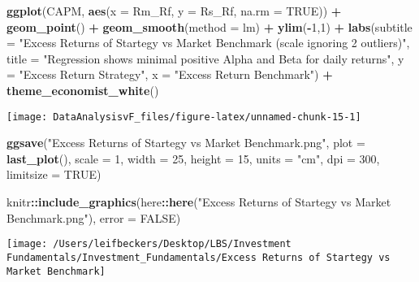 \documentclass[
]{article}
\newenvironment{Shaded}{\begin{snugshade}}{\end{snugshade}}
\newcommand{\DataTypeTok}[1]{\textcolor[rgb]{0.13,0.29,0.53}{#1}}
\newcommand{\DecValTok}[1]{\textcolor[rgb]{0.00,0.00,0.81}{#1}}
\newcommand{\KeywordTok}[1]{\textcolor[rgb]{0.13,0.29,0.53}{\textbf{#1}}}
\newcommand{\NormalTok}[1]{#1}
\newcommand{\OperatorTok}[1]{\textcolor[rgb]{0.81,0.36,0.00}{\textbf{#1}}}
\newcommand{\OtherTok}[1]{\textcolor[rgb]{0.56,0.35,0.01}{#1}}
\newcommand{\StringTok}[1]{\textcolor[rgb]{0.31,0.60,0.02}{#1}}
\begin{document}
\begin{Shaded}
\begin{Highlighting}[]
\KeywordTok{ggplot}\NormalTok{(CAPM, }\KeywordTok{aes}\NormalTok{(}\DataTypeTok{x =}\NormalTok{ Rm\_Rf, }\DataTypeTok{y =}\NormalTok{ Rs\_Rf, }\DataTypeTok{na.rm =} \OtherTok{TRUE}\NormalTok{)) }\OperatorTok{+}
\StringTok{  }\KeywordTok{geom\_point}\NormalTok{() }\OperatorTok{+}
\StringTok{  }\KeywordTok{geom\_smooth}\NormalTok{(}\DataTypeTok{method =}\NormalTok{ lm)  }\OperatorTok{+}
\StringTok{  }\KeywordTok{ylim}\NormalTok{(}\OperatorTok{{-}}\DecValTok{1}\NormalTok{,}\DecValTok{1}\NormalTok{) }\OperatorTok{+}
\StringTok{  }\KeywordTok{labs}\NormalTok{(}\DataTypeTok{subtitle =} \StringTok{"Excess Returns of Startegy vs Market Benchmark (scale ignoring 2 outliers)"}\NormalTok{,}
       \DataTypeTok{title =} \StringTok{"Regression shows minimal positive Alpha and Beta for daily returns"}\NormalTok{,}
       \DataTypeTok{y =} \StringTok{"Excess Return Strategy"}\NormalTok{,}
       \DataTypeTok{x =} \StringTok{"Excess Return Benchmark"}\NormalTok{) }\OperatorTok{+}\StringTok{ }
\StringTok{  }\KeywordTok{theme\_economist\_white}\NormalTok{()}
\end{Highlighting}
\end{Shaded}

\begin{center}\texttt{[image: DataAnalysisvF\_files/figure-latex/unnamed-chunk-15-1]} \end{center}

\begin{Shaded}
\begin{Highlighting}[]
\KeywordTok{ggsave}\NormalTok{(}\StringTok{"Excess Returns of Startegy vs Market Benchmark.png"}\NormalTok{,}
       \DataTypeTok{plot =} \KeywordTok{last\_plot}\NormalTok{(),}
       \DataTypeTok{scale =} \DecValTok{1}\NormalTok{,}
       \DataTypeTok{width =} \DecValTok{25}\NormalTok{,}
       \DataTypeTok{height =} \DecValTok{15}\NormalTok{,}
       \DataTypeTok{units =} \StringTok{"cm"}\NormalTok{,}
       \DataTypeTok{dpi =} \DecValTok{300}\NormalTok{,}
       \DataTypeTok{limitsize =} \OtherTok{TRUE}\NormalTok{)}

\NormalTok{knitr}\OperatorTok{::}\KeywordTok{include\_graphics}\NormalTok{(here}\OperatorTok{::}\KeywordTok{here}\NormalTok{(}\StringTok{"Excess Returns of Startegy vs Market Benchmark.png"}\NormalTok{), }\DataTypeTok{error =} \OtherTok{FALSE}\NormalTok{)}
\end{Highlighting}
\end{Shaded}

\begin{center}\texttt{[image: /Users/leifbeckers/Desktop/LBS/Investment Fundamentals/Investment\_Fundamentals/Excess Returns of Startegy vs Market Benchmark]} \end{center}
\end{document}
